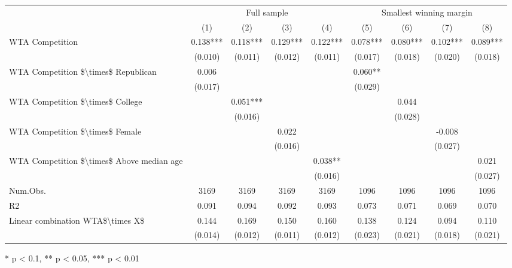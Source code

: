 \begin{table}[t]
\fontsize{12.0pt}{14.4pt}\selectfont
\begin{tabular*}{\linewidth}{@{\extracolsep{\fill}}lcccccccc}
\toprule
 & \multicolumn{4}{c}{Full sample} & \multicolumn{4}{c}{Smallest winning margin} \\ 
\cmidrule(lr){2-5} \cmidrule(lr){6-9}
  & (1) & (2) & (3) & (4) & (5) & (6) & (7) & (8) \\ 
\midrule\addlinespace[2.5pt]
WTA Competition & 0.138*** & 0.118*** & 0.129*** & 0.122*** & 0.078*** & 0.080*** & 0.102*** & 0.089*** \\ 
 & (0.010) & (0.011) & (0.012) & (0.011) & (0.017) & (0.018) & (0.020) & (0.018) \\ 
WTA Competition \$\textbackslash{}times\$ Republican & 0.006 &  &  &  & 0.060** &  &  &  \\ 
 & (0.017) &  &  &  & (0.029) &  &  &  \\ 
WTA Competition \$\textbackslash{}times\$ College &  & 0.051*** &  &  &  & 0.044 &  &  \\ 
 &  & (0.016) &  &  &  & (0.028) &  &  \\ 
WTA Competition \$\textbackslash{}times\$ Female &  &  & 0.022 &  &  &  & -0.008 &  \\ 
 &  &  & (0.016) &  &  &  & (0.027) &  \\ 
WTA Competition \$\textbackslash{}times\$ Above median age &  &  &  & 0.038** &  &  &  & 0.021 \\ 
{} & {} & {} & {} & {(0.016)} & {} & {} & {} & {(0.027)} \\ 
Num.Obs. & 3169 & 3169 & 3169 & 3169 & 1096 & 1096 & 1096 & 1096 \\ 
R2 & 0.091 & 0.094 & 0.092 & 0.093 & 0.073 & 0.071 & 0.069 & 0.070 \\ 
Linear combination WTA\$\textbackslash{}times X\$ & 0.144 & 0.169 & 0.150 & 0.160 & 0.138 & 0.124 & 0.094 & 0.110 \\ 
 & (0.014) & (0.012) & (0.011) & (0.012) & (0.023) & (0.021) & (0.018) & (0.021) \\ 
\bottomrule
\end{tabular*}
\begin{minipage}{\linewidth}
* p < 0.1, ** p < 0.05, *** p < 0.01\\
\end{minipage}
\end{table}

